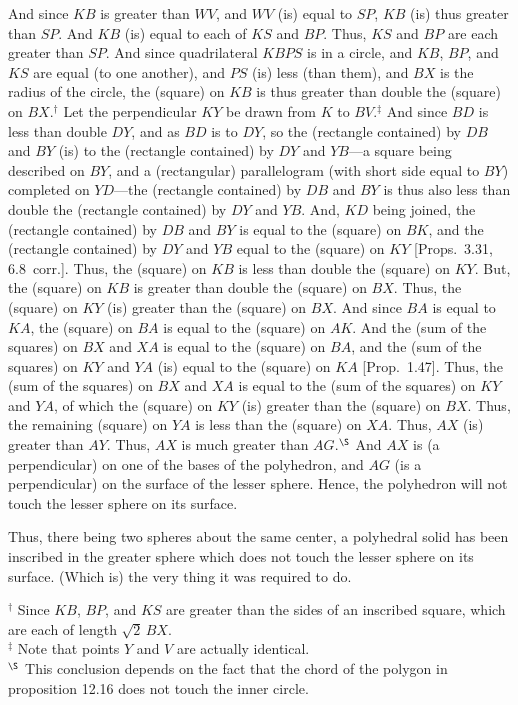 \begin{Parallel}{}{}
{And since $KB$ is greater than $WV$, and $WV$ (is) equal to $SP$, $KB$ (is) thus greater than
$SP$. And $KB$ (is) equal to each of $KS$ and $BP$. Thus, $KS$ and $BP$ are each greater than $SP$. 
And since quadrilateral $KBPS$ is in a circle, and $KB$, $BP$, and $KS$ are equal (to one another), and $PS$ (is) less (than them),
and $BX$ is the radius of the circle, the (square) on $KB$ is thus greater than
double the (square) on $BX$.$^\dag$
Let the perpendicular  $KY$ be drawn from $K$ to $BV$.$^\ddag$ And since $BD$ is less than double
$DY$, and as $BD$ is to $DY$, so the (rectangle contained) by $DB$ and $BY$ (is) to the (rectangle contained) by $DY$
and $YB$---a square being described on $BY$, and a (rectangular) parallelogram (with short side equal to $BY$) completed on $YD$---the (rectangle contained) by $DB$ and $BY$ is thus also less than double the (rectangle contained) by $DY$ and $YB$.
And, $KD$ being joined, the (rectangle contained) by $DB$ and $BY$ is equal to the (square) on $BK$, and the
(rectangle contained) by $DY$ and $YB$ equal to the (square) on $KY$ [Props.~3.31, 6.8~corr.]. Thus, the (square) on $KB$ is  less than double the (square) on $KY$. But, the (square) on $KB$ is greater than
double the (square) on $BX$. 
Thus, the (square) on $KY$ (is) greater than the (square) on $BX$.  And since $BA$ is equal to $KA$, the (square) on $BA$ is
equal to the (square) on $AK$. And the (sum of the squares) on $BX$ and $XA$ is equal to the (square) on $BA$, and
the (sum of the squares) on $KY$ and $YA$ (is) equal to the (square) on 
$KA$   [Prop.~1.47]. 
Thus, the (sum of the squares) on $BX$ and $XA$ is equal to the (sum of the squares) on $KY$ and $YA$, of
which the (square) on $KY$ (is) greater than the (square) on $BX$. Thus, the remaining (square) on $YA$ is less than the
(square) on $XA$. Thus, $AX$ (is) greater than $AY$. Thus, $AX$ is much greater than $AG$.$^\S$ And $AX$ is (a perpendicular) on one of the bases of the
polyhedron, and $AG$ (is a perpendicular) on the surface of the lesser sphere. Hence, the polyhedron will not touch the lesser sphere on its
surface.

Thus, there being two spheres about the same center, a polyhedral solid has been inscribed in the greater sphere which does not
touch the lesser sphere on its surface. (Which is) the very thing it was required to do.}
\end{Parallel}
{\footnotesize\noindent$^\dag$ Since $KB$, $BP$,
and $KS$ are greater than the sides of an inscribed square, which are each of length $\sqrt{2}\,BX$.\\
$^\ddag$ Note that points $Y$ and $V$ are actually identical.\\
$^\S$ This conclusion depends on the fact that the chord of the polygon in proposition 12.16 does not touch the inner circle.}~\\

